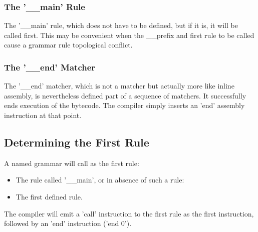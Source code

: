 \subsubsection{The '\_\_main' Rule}

The '\_\_main' rule, which does not have to be defined, but if it is,
it will be called first. This may be convenient when the \_\_prefix and
first rule to be called cause a grammar rule topological conflict.

\subsubsection{The '\_\_end' Matcher}

The '\_\_end' matcher, which is not a matcher but actually more like
inline assembly, is nevertheless defined part of a sequence
of matchers. It successfully ends execution of the bytecode.
The compiler simply inserts an 'end' assembly instruction at that point.

\subsection{Determining the First Rule}

A named grammar will call as the first rule:

\begin{itemize}
\item The rule called '\_\_main', or in absence of such a rule:
\item The first defined rule.
\end{itemize}

The compiler will emit a 'call' instruction to the first rule as the
first instruction, followed by an 'end' instruction ('end 0').
